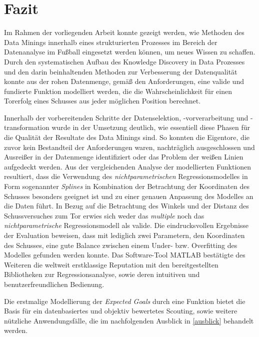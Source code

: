 \section{Fazit}
Im Rahmen der vorliegenden Arbeit konnte gezeigt werden, wie Methoden des Data Minings innerhalb eines strukturierten Prozesses im Bereich der Datenanalyse im Fußball eingesetzt werden können, um neues Wissen zu schaffen. Durch den systematischen Aufbau des Knowledge Discovery in Data Prozesses und den darin beinhaltenden Methoden zur Verbesserung der Datenqualität konnte aus der rohen Datenmenge, gemäß den Anforderungen, eine valide und fundierte Funktion modelliert werden, die die Wahrscheinlichkeit für einen Torerfolg eines Schusses aus jeder möglichen Position berechnet. 

Innerhalb der vorbereitenden Schritte der Datenselektion, -vorverarbeitung und -transformation wurde in der Umsetzung deutlich, wie essentiell diese Phasen für die Qualität der Resultate des Data Minings sind. So konnten die Eigentore, die zuvor kein Bestandteil der Anforderungen waren, nachträglich ausgeschlossen und Ausreißer in der Datenmenge identifiziert oder das Problem der weißen Linien aufgedeckt werden. Aus der vergleichenden Analyse der modellierten Funktionen resultiert, dass die Verwendung des \textit{nichtparametrischen} Regressionsmodelles in Form sogenannter \textit{Splines} in Kombination der Betrachtung der Koordinaten des Schusses besonders geeignet ist und zu einer genauen Anpassung des Modelles an die Daten führt. In Bezug auf die Betrachtung des Winkels und der Distanz des Schussversuches zum Tor erwies sich weder das \textit{multiple} noch das \textit{nichtparametrische} Regressionsmodell als valide. Die eindrucksvollen Ergebnisse der Evaluation beweisen, dass mit lediglich zwei Parametern, den Koordinaten des Schusses, eine gute Balance zwischen einem Under- bzw. Overfitting des Modelles gefunden werden konnte. Das Software-Tool MATLAB bestätigte des Weiteren die weltweit erstklassige Reputation mit den bereitgestellten Bibliotheken zur Regressionsanalyse, sowie deren intuitiven und benutzerfreundlichen Bedienung. \enlargethispage{2\baselineskip} 

Die erstmalige Modellierung der \textit{Expected Goals} durch eine Funktion bietet die Basis für ein datenbasiertes und objektiv bewertetes Scouting, sowie weitere nützliche Anwendungsfälle, die im nachfolgenden Ausblick in \vref{ausblick} behandelt werden.

